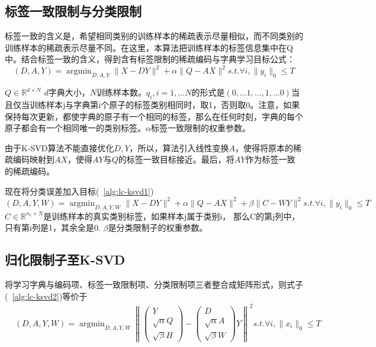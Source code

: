     \subsection{标签一致限制与分类限制}
    \label{sec:ksvd-constraint}
    标签一致的含义是，希望相同类别的训练样本的稀疏表示尽量相似，而不同类别的训练样本的稀疏表示尽量不同。在这里，本算法把训练样本的标签信息集中在Q中。结合标签一致的含义，得到含有标签限制的稀疏编码与字典学习目标公式\cite{jiang2013label}：
    \begin{equation}
    \label{alg:lc-ksvd1}
    (D, A, Y) = \mathop{\arg \min} _{D, A, Y} \|X - DY\| ^ 2 + \alpha\|Q - AX\|^2 s.t. \forall i, \|y_i\|_0 \le T
    \end{equation}

     $Q\in \mathbb{R}^{d \times N}$ $d$字典大小，$N$训练样本数。$q_i, i = 1, \dots N$的形式是$(0, \dots 1, \dots, 1, \dots 0)$当且仅当训练样本j与字典第i个原子的标签类别相同时，取1，否则取0。注意，如果保持每次更新，都使字典的原子有一个相同的标签，那么在任何时刻，字典的每个原子都会有一个相同唯一的类别标签。$\alpha $标签一致限制的权重参数。

    由于K-SVD算法不能直接优化$D, Y$，所以，算法引入线性变换$A$，使得将原本的稀疏编码映射到$AX$，使得$AY$与$Q$的标签一致目标接近。最后，将$AY$作为标签一致的稀疏编码。



    现在将分类误差加入目标(~\ref{alg:lc-ksvd1})\cite{jiang2013label}
    \begin{equation}
    \label{alg:lc-ksvd2}
    (D, A, Y, W) = \mathop{\arg \min} _{D, A, Y, W} \|X - DY\| ^ 2 + \alpha\|Q - AX\|^2 + \beta\|C - WY\|^2 s.t. \forall i, \|y_i\|_0 \le T
    \end{equation}
    $C\in \mathbb{R}^{n_c \times N}$是训练样本的真实类别标签，如果样本j属于类别i， 那么C的第j列中，只有第i列是1，其余全是0. $\beta$是分类限制子的权重参数。

    \subsection{归化限制子至K-SVD}

    将学习字典与编码项、标签一致限制项、分类限制项三者整合成矩阵形式\cite{jiang2013label}，则式子(~\ref{alg:lc-ksvd2})等价于
    \begin{equation}
    \begin{split}
    & (D, A, Y, W) = \mathop{\arg\min}_{D, A, Y, W} \left\|\begin{pmatrix} Y \\ \sqrt{\alpha} Q \\ \sqrt{\beta}H\end{pmatrix} - \begin{pmatrix} D \\ \sqrt{\alpha} A \\ \sqrt{\beta}W\end{pmatrix} Y\right\| ^2 s.t. \forall i, \|x_i\|_0 \le T
    \end{split}
    \end{equation}


